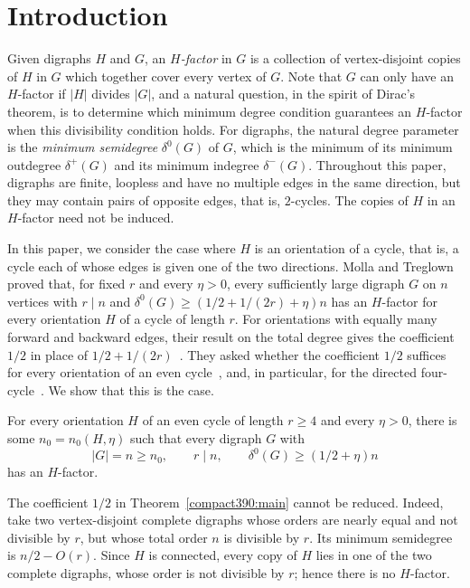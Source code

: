 \section{Introduction}\label{sec:intro}
Given digraphs $H$ and $G$, an \emph{$H$-factor} in $G$ is a collection of vertex-disjoint copies of $H$ in $G$ which together cover every vertex of $G$.
Note that $G$ can only have an $H$-factor if $|H|$ divides $|G|$, and a natural question, in the spirit of Dirac's theorem, is to determine which minimum degree condition guarantees an $H$-factor when this divisibility condition holds.
For digraphs, the natural degree parameter is the \emph{minimum semidegree} $\delta^0(G)$ of $G$, which is the minimum of its minimum outdegree $\delta^+(G)$ and its minimum indegree $\delta^-(G)$.
Throughout this paper, digraphs are finite, loopless and have no multiple edges in the same direction, but they may contain pairs of opposite edges, that is, $2$-cycles. The copies of $H$ in an $H$-factor need not be induced.

In this paper, we consider the case where $H$ is an orientation of a cycle, that is, a cycle each of whose edges is given one of the two directions.
Molla and Treglown~\cite[Theorem~1.7]{MT} proved that, for fixed $r$ and every $\eta>0$, every sufficiently large digraph $G$ on $n$ vertices with $r\mid n$ and $\delta^0(G)\ge(1/2+1/(2r)+\eta)n$ has an $H$-factor for every orientation $H$ of a cycle of length $r$.
For orientations with equally many forward and backward edges, their result on the total degree gives the coefficient $1/2$ in place of $1/2+1/(2r)$~\cite[Corollary~1.3]{MT}.
They asked whether the coefficient $1/2$ suffices for every orientation of an even cycle~\cite[Question~7.2]{MT}, and, in particular, for the directed four-cycle~\cite[Conjecture~7.1]{MT}.
We show that this is the case.

\begin{theorem}\label{compact390:main}
For every orientation $H$ of an even cycle of length $r\ge4$
and every $\eta>0$, there is some $n_0=n_0(H,\eta)$ such that every
digraph $G$ with
\[
 |G|=n\ge n_0,\qquad r\mid n,\qquad
 \delta^0(G)\ge(1/2+\eta)n
\]
has an $H$-factor.
\end{theorem}

The coefficient $1/2$ in Theorem~\ref{compact390:main} cannot be reduced. Indeed, take two vertex-disjoint complete digraphs whose orders are nearly equal and not divisible by $r$, but whose total order $n$ is divisible by $r$. Its minimum semidegree is $n/2-O(r)$. Since $H$ is connected, every copy of $H$ lies in one of the two complete digraphs, whose order is not divisible by $r$; hence there is no $H$-factor.

